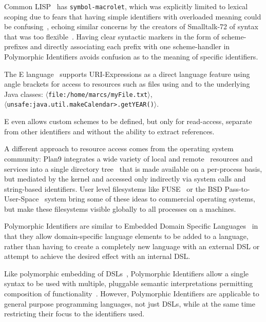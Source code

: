 \documentclass[preprint]{sigplanconf}
\begin{document}
Common LISP~\cite{Steele:1990:CLL:95411} has {\tt symbol-macrolet}, which was explicitly limited to lexical scoping due to fears 
that having simple identifiers with overloaded meaning could be confusing~\cite{gabriel-lisp-identifiers}, echoing similar concerns by the creators
of Smalltalk-72 of syntax that was too flexible~\cite{Kay:1996:EHS:234286.1057828}.  Having clear syntactic markers in the form of scheme-prefixes
and directly associating each prefix with one scheme-handler in Polymorphic Identifiers avoids confusion as to the meaning of specific identifiers.

The E language~\cite{MillerRobustComposition}  supports URI-Expressions as a direct language feature using angle brackets for access to 
resources such as files using and to the underlying Java classes:   {\tt $\langle$file:/home/marcs/myFile.txt$\rangle$},  \\ {\tt $\langle$unsafe:java.util.makeCalendar>.getYEAR()$\rangle$}.

E even allows custom schemes to be defined, but  only for read-access, separate from other identifiers and without the ability to extract references.

A different approach to resource access comes from the operating system community:  Plan9 
integrates a wide variety of local and remote~\cite{plan9network} resources and services into a single directory tree~\cite{plan9names} that is made available on a per-process basis, but mediated by the kernel and accessed only indirectly via system calls and string-based
identifiers.
User level filesystems like FUSE~\cite{fuse} or the BSD Pass-to-User-Space~\cite{kantee:puffs} 
system bring some of these ideas to commercial operating systems, but make these filesystems visible globally to all
processes on a machines. 


Polymorphic Identifiers are similar to Embedded Domain Specific Languages~\cite{edsl}
in that they allow domain-specific language elements to be added to a language, rather
than having to create a completely new language with an external DSL or attempt to 
achieve the desired effect with an internal DSL\cite{fowlerdsl}.  

Like polymorphic embedding of DSLs~\cite{polydsl}, Polymorphic Identifiers allow
a single syntax to be used with multiple, pluggable semantic interpretations permitting
composition of functionality~\cite{embeddeddsl}.  However, Polymorphic Identifiers
are applicable to general purpose programming languages, not just DSLs, while
at the same time restricting their focus to the identifiers used.
\end{document}
